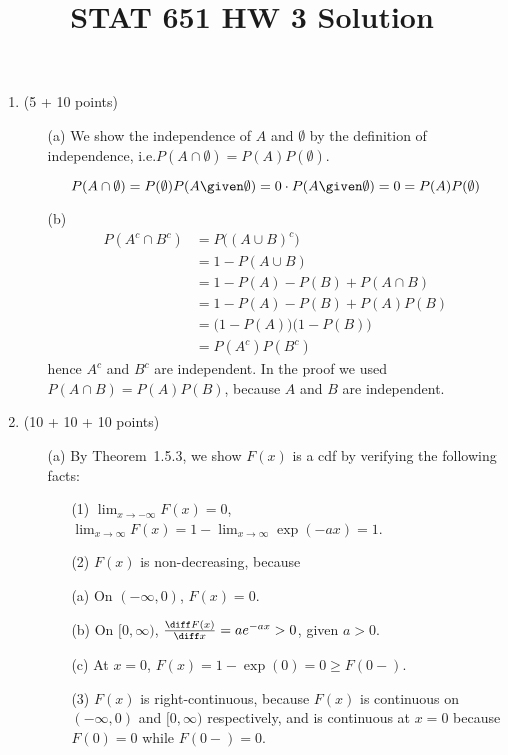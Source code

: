 \documentclass[12pt]{article}
\begin{document}
\title{STAT 651 HW 3 Solution}
\maketitle

\begin{enumerate}
\item (5 + 10 points)
\begin{enumerate}
\item[(a)]
We show the independence of $A$ and $\emptyset$ by the definition of
independence, i.e.\@ $P(A\cap \emptyset) = P(A) P(\emptyset)$.

\[
P(A \cap \emptyset)
= P(\emptyset) P(A \given \emptyset)
= 0\cdot P(A \given \emptyset)
= 0
= P(A)P(\emptyset)
\]

\item[(b)]
\[\begin{split}
P(A^c \cap B^c)
&= P\bigl((A \cup B)^c\bigr)
\\
&= 1 - P(A \cup B)
\\
&= 1 - P(A) - P(B) + P(A \cap B)
\\
&= 1 - P(A) - P(B) + P(A)P(B)
\\
&= \bigl(1 - P(A)\bigr) \bigl(1 - P(B)\bigr)
\\
&= P(A^c) P(B^c)
\end{split}
\]
hence $A^c$ and $B^c$ are independent.
In the proof we used
$P(A\cap B) = P(A)P(B)$, because $A$ and $B$ are independent.
\end{enumerate}

\item (10 + 10 + 10 points)

\begin{enumerate}
\item[(a)]
By Theorem~1.5.3,
we show $F(x)$ is a cdf by verifying the following facts:

\begin{enumerate}
\item[(1)] $\lim_{x\to -\infty} F(x) = 0$,
$\lim_{x\to \infty} F(x) = 1 - \lim_{x\to \infty} \exp(-ax) = 1$.

\item[(2)] $F(x)$ is non-decreasing, because

(a) On $(-\infty, 0)$, $F(x) = 0$.

(b) On $[0, \infty)$,
$\frac{\diff F(x)}{\diff x} = a e^{-ax} > 0$,
given $a > 0$.

(c) At $x=0$, $F(x) = 1 - \exp(0) = 0 \ge F(0-)$.
\item[(3)]
$F(x)$ is right-continuous,
because $F(x)$ is continuous on
$(-\infty, 0)$ and $[0, \infty)$ respectively,
and is continuous at $x=0$ because
$F(0) = 0$ while $F(0-) = 0$.
\end{enumerate}


\end{enumerate}
\end{enumerate}
\end{document}
